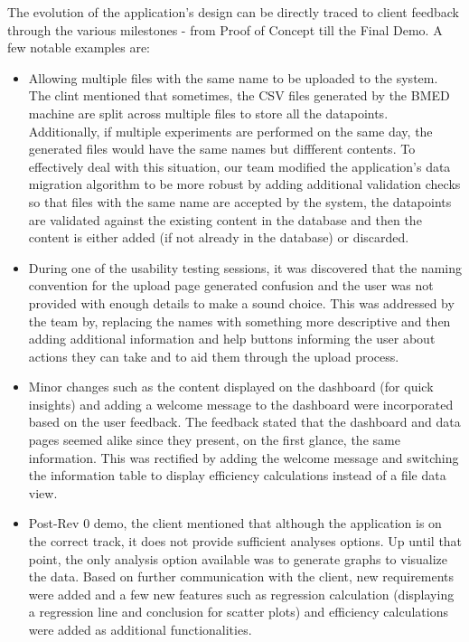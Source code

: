 \documentclass{article}
\begin{document}
The evolution of the application's design can be directly traced to client feedback 
through the various milestones - from Proof of Concept till the Final Demo. A few notable 
examples are:
\begin{itemize}
    \item Allowing multiple files with the same name to be uploaded to the system. The clint 
    mentioned that sometimes, the CSV files generated by the BMED machine are split across multiple 
    files to store all the datapoints. Additionally, if multiple experiments are performed on the same 
    day, the generated files would have the same names but diffferent contents. To effectively deal 
    with this situation, our team modified the application's data migration algorithm to be more robust 
    by adding additional validation checks so that files with the same name are accepted by the system, the 
    datapoints are validated against the existing content in the database and then the content is either 
    added (if not already in the database) or discarded.
    \item During one of the usability testing sessions, it was discovered that the naming convention for 
    the upload page generated confusion and the user was not provided with enough details to make a sound choice.
    This was addressed by the team by, replacing the names with something more descriptive and then adding 
    additional information and help buttons informing the user about actions they can take and to aid them 
    through the upload process.
    \item Minor changes such as the content displayed on the dashboard (for quick insights) and adding a welcome 
    message to the dashboard were incorporated based on the user feedback. The feedback stated that the dashboard and 
    data pages seemed alike since they present, on the first glance, the same information. This was rectified 
    by adding the welcome message and switching the information table to display efficiency calculations instead 
    of a file data view.
    \item Post-Rev 0 demo, the client mentioned that although the application is on the correct track, it does not 
    provide sufficient analyses options. Up until that point, the only analysis option available was to generate 
    graphs to visualize the data. Based on further communication with the client, new requirements were added and 
    a few new features such as regression calculation (displaying a regression line and conclusion for scatter plots) 
    and efficiency calculations were added as additional functionalities.
\end{itemize}
\end{document}
